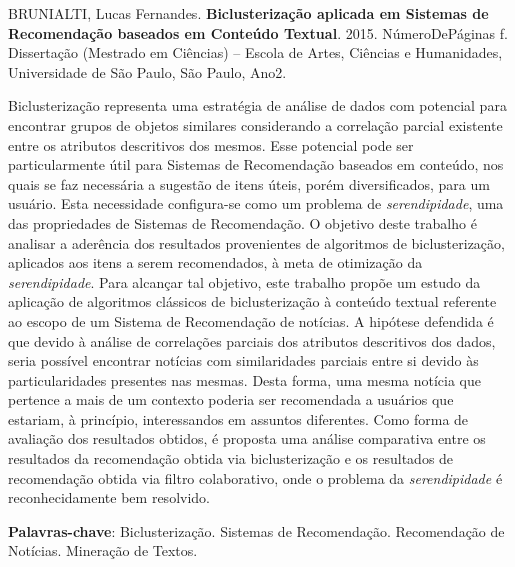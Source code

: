 \documentclass[normaltoc, espacoumemeio, pnumromarab,ruledheader]{abnt}
\begin{document}
\begin{resumo}
\begin{flushleft}
\noindent BRUNIALTI, Lucas Fernandes. \textbf{Biclusterização aplicada em Sistemas de Recomendação baseados em Conteúdo Textual}. 2015. NúmeroDePáginas f. Dissertação (Mestrado em Ciências) -- Escola de Artes, Ciências e Humanidades, Universidade de São Paulo, São Paulo, Ano2.
\newline
\end{flushleft}


\noindent Biclusterização representa uma estratégia de análise de dados com potencial para encontrar grupos de objetos similares considerando a correlação parcial existente entre os atributos descritivos dos mesmos.
Esse potencial pode ser particularmente útil para Sistemas de Recomendação baseados em conteúdo, nos quais se faz necessária a sugestão de itens úteis, porém diversificados, para um usuário.
Esta necessidade configura-se como um problema de \textit{serendipidade}, uma das propriedades de Sistemas de Recomendação.
O objetivo deste trabalho é analisar a aderência dos resultados provenientes de algoritmos de biclusterização, aplicados aos itens a serem recomendados, à meta de otimização da \textit{serendipidade}.
Para alcançar tal objetivo, este trabalho propõe um estudo da aplicação de algoritmos clássicos de biclusterização à conteúdo textual referente ao escopo de um Sistema de Recomendação de notícias.
A hipótese defendida é que devido à análise de correlações parciais dos atributos descritivos dos dados, seria possível encontrar notícias com similaridades parciais entre si devido às particularidades presentes nas mesmas.
Desta forma, uma mesma notícia que pertence a mais de um contexto poderia ser recomendada a usuários que estariam, à princípio, interessandos em assuntos diferentes.
Como forma de avaliação dos resultados obtidos, é proposta uma análise comparativa entre os resultados da recomendação obtida via biclusterização e os resultados de recomendação obtida via filtro colaborativo, onde o problema da \textit{serendipidade} é reconhecidamente bem resolvido.
\end{resumo}


\par
\vspace{2em}
\noindent \textbf{Palavras-chave}: Biclusterização.
Sistemas de Recomendação.
Recomendação de Notícias.
Mineração de Textos.
\end{document}

